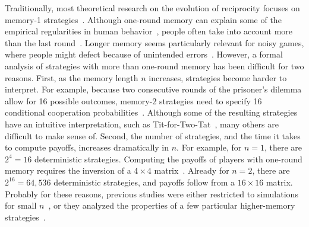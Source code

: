 \documentclass[11pt]{article}
\begin{document}
Traditionally, most theoretical research on the evolution of reciprocity focuses on memory-1 strategies~\citep{nowak:Nature:1993,imhof:PNAS:2005,grujic:jtb:2012,van-segbroeck:prl:2012,press:PNAS:2012,stewart:pnas:2013,Toupo:IJBC:2014,stewart:pnas:2014, akin:EGADS:2016,glynatsi:scientific:2020,chen:PNASnexus:2023}. 
Although one-round memory can explain some of the empirical regularities in human behavior~\cite{engle:ET:2006, dal:AER:2011, camera:GEB:2012, bruttel:TD:2012,Montero-Porras:SciRep:2022},  people often take into account more than the last round~\cite{romero:EER:2018}.
Longer memory seems particularly relevant for noisy games, where people might defect because of unintended errors~\cite{fudenberg:AER:2012}. 
However, a formal analysis of strategies with more than one-round memory has been difficult for two reasons. 
First, as the memory length $n$ increases, strategies become harder to interpret. 
For example, because two consecutive rounds of the prisoner's dilemma allow for 16 possible outcomes, memory-2 strategies need to specify 16 conditional cooperation probabilities~\citep{hauert:PRSB:1997}. 
Although some of the resulting strategies have an intuitive interpretation, such as Tit-for-Two-Tat~\citep{axelrod:AAAS:1981}, many others are difficult to make sense of. 
Second, the number of strategies, and the time it takes to compute payoffs, increases dramatically in $n$. 
For example, for $n\!=\!1$, there are $2^4\!=\!16$ deterministic strategies. 
Computing the payoffs of players with one-round memory requires the inversion of a $4\!\times\!4$ matrix~\cite{sigmund2010}. 
Already for $n\!=\!2$, there are $2^{16}\!=\!64,536$ deterministic strategies, and payoffs follow from a $16\!\times\!16$ matrix. 
Probably for these reasons, previous studies were either restricted to simulations for small $n$~\citep{hauert:PRSB:1997,stewart:scientific:2016,Murase:PLoSCompBio:2023a}, or they analyzed the properties of a few particular higher-memory strategies~\citep{hilbe:PNAS:2017,ueda:RSOP:2021,li:NatureCompSci:2022}. 
\end{document}
